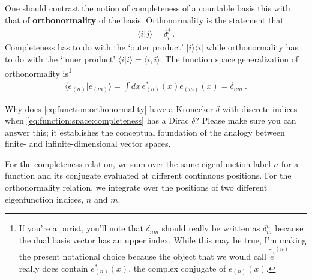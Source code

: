 

One should contrast the notion of completeness of a countable basis this with that of \textbf{orthonormality} of the basis. Orthonormality is the statement that
\begin{align}
  \langle i | j \rangle = \delta^j_i \ .
\end{align}
Completeness has to do with the `outer product' $|i\rangle \langle i|$ while orthonormality has to do with the `inner product' $\langle i | i\rangle = \langle i, i\rangle$. The function space generalization of orthonormality is\footnote{If you're a purist, you'll note that $\delta_{nm}$ should really be written as $\delta^n_m$ because the dual basis vector has an upper index. While this may be true, I'm making the present notational choice because the object that we would call $\tilde{\vec{e}}^{(n)}$ really does contain $e_{(n)}^*(x)$, the complex conjugate of $e_{(n)}(x)$.}
\begin{align}
  \langle e_{(n)} | e_{(m)} \rangle = \int dx \, e_{(n)}^*(x) e_{(m)}(x) = \delta_{nm} \ .
  \label{eq:function:orthonormality}
\end{align}
\begin{exercise}
Why does \eqref{eq:function:orthonormality} have a Kronecker $\delta$ with discrete indices when \eqref{eq:function:space:completeness} has a Dirac $\delta$? Please make sure you can answer this; it establishes the conceptual foundation of the analogy between finite- and infinite-dimensional vector spaces.
\end{exercise}
For the completeness relation, we sum over the same eigenfunction label $n$ for a function and its conjugate evaluated at different continuous positions. For the orthonormality relation, we integrate over the positions of two different eigenfunction indices, $n$ and $m$. 

